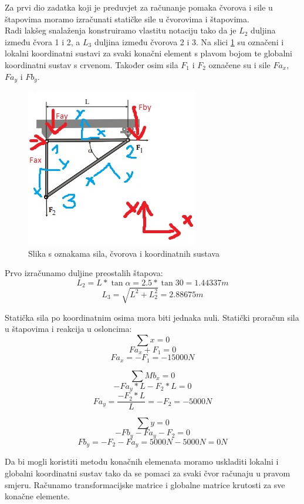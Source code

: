 \documentclass[a4paper,twoside,12pt]{memoir} %
\begin{document}
Za prvi dio zadatka koji je preduvjet za računanje pomaka čvorova i sile u štapovima moramo izračunati statičke sile u čvorovima i štapovima. \\
Radi lakšeg snalaženja konstruiramo vlastitu notaciju tako da je $L_2$ duljina između čvora 1 i 2, a $L_3$ duljina između čvorova 2 i 3. Na slici \ref{fig:problem_noted} su označeni i lokalni koordinatni sustavi za svaki konačni element s plavom bojom te globalni koordinatni sustav s crvenom. Također osim sila $F_1$ i $F_2$ označene su i sile $Fa_x$, $Fa_y$ i $Fb_y$.

\begin{figure}[h!t]
\begin{center}
\includegraphics[scale=0.9]{pictures/chapter_fem/problem_glavas_notacija.jpg}
\caption{Slika s oznakama sila, čvorova i koordinatnih sustava}
\label{fig:problem_noted}
\end{center}
\end{figure}

Prvo izračunamo duljine preostalih štapova:
$$ L_2 = L * \tan{\alpha} = 2.5 * \tan{30} = 1.44337 m$$
$$ L_3 = \sqrt{L^2 + L^2_2} = 2.88675 m $$

Statička sila po koordinatnim osima mora biti jednaka nuli.
Statički proračun sila u štapovima i reakcija u osloncima:
$$ \sum x = 0 $$
$$ Fa_x + F_1 = 0 $$
$$ Fa_x = -F_1 = -15000 N $$
\newline

$$ \sum Mb_x = 0 $$
$$ -Fa_y * L - F_2 * L = 0 $$
$$ Fa_y = \frac{-F_2 * L}{L} = -F_2 = -5000 N $$
\newline

$$ \sum y = 0 $$
$$ -Fb_y - Fa_y - F_2 = 0 $$
$$ Fb_y = -F_2 - Fa_y = 5000 N - 5000 N = 0 N $$
\newline


Da bi mogli koristiti metodu konačnih elemenata moramo uskladiti lokalni i globalni koordinatni sustav tako da se pomaci za svaki čvor računaju u pravom smjeru. Računamo transformacijske matrice i globalne matrice krutosti za sve konačne elemente. \par
\end{document}
